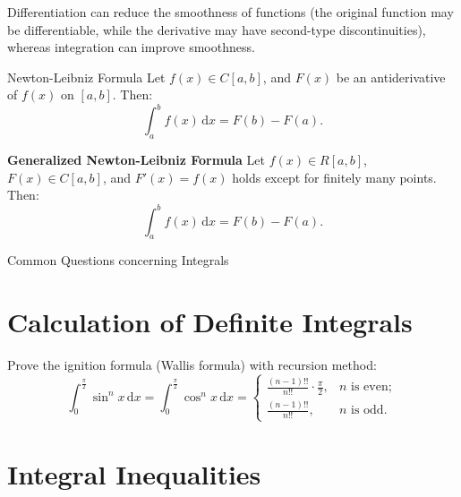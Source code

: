 \documentclass[11pt]{../../TexTemplate/elegantbook}
\begin{document}
\begin{remark}
        Differentiation can reduce the smoothness of functions (the original function may be differentiable, 
        while the derivative may have second-type discontinuities), whereas integration can improve smoothness.
\end{remark}

\begin{theorem}{Newton-Leibniz Formula}
    Let \( f(x) \in C[a, b] \), and \( F(x) \) be an antiderivative of \( f(x) \) on \( [a, b] \). Then:
    \[
    \int_{a}^{b} f(x) \, \mathrm{d}x = F(b) - F(a).
    \]

    \textbf{Generalized Newton-Leibniz Formula}
    Let \( f(x) \in R[a, b] \), \( F(x) \in C[a, b] \), and \( F'(x) = f(x) \) holds except for finitely many points. 
    Then:
    \[
    \int_{a}^{b} f(x) \, \mathrm{d}x = F(b) - F(a).
    \]
\end{theorem}



\begin{leftbarTitle}{Common Questions concerning Integrals}\end{leftbarTitle}

\section{Calculation of Definite Integrals}



\begin{example}
    Prove the ignition formula (Wallis formula) with recursion method:
    \[
    \int_{0}^{\frac{\pi}{2}} \sin^{n} x \, \mathrm{d}x 
    = \int_{0}^{\frac{\pi}{2}} \cos^{n} x \, \mathrm{d}x
    = \begin{cases}
    \frac{(n-1)!!}{n!!} \cdot \frac{\pi}{2}, & n \text{ is even}; \\
    \frac{(n-1)!!}{n!!}, & n \text{ is odd}.
    \end{cases}
    \]
\end{example}


\section{Integral Inequalities}
\end{document}
